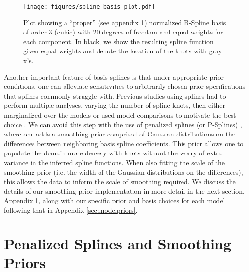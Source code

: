 \begin{figure}[ht!]
    \begin{centering}
        \texttt{[image: figures/spline\_basis\_plot.pdf]}
        \caption{Plot showing a ``proper'' (see appendix \ref{sec:psplines}) normalized B-Spline basis of order 3 (cubic) with 20 degrees of freedom and equal weights for each component. 
        In black, we show the resulting spline function given equal weights and denote the location of the knots with gray x's.}
        \label{fig:spline_basis}
    \end{centering}
\end{figure}

Another important feature of basis splines is that under appropriate prior conditions, one can alleviate sensitivities to arbitrarily 
chosen prior specifications that splines commonly struggle with. Previous studies using splines had to perform multiple analyses, varying the 
number of spline knots, then either marginalized over the models or used model comparisons to motivate the best choice \citep{Edelman_2022ApJ}. 
We can avoid this step with the use of penalized splines (or P-Splines) \citep{eilers2021practical,BayesianPSplines,Jullion2007RobustSO}, 
where one adds a smoothing prior comprised of Gaussian distributions on the differences between neighboring basis spline coefficients. 
This prior allows one to populate the domain more densely with knots without the worry of extra variance in the inferred spline functions. When also fitting the scale 
of the smoothing prior (i.e. the width of the Gaussian distributions on the differences), this allows the data to inform the scale of smoothing required. 
We discuss the details of our smoothing prior implementation in more detail in the next section, Appendix \ref{sec:psplines}, 
along with our specific prior and basis choices for each model following that in Appendix \ref{sec:modelpriors}.

\section{Penalized Splines and Smoothing Priors}\label{sec:psplines}

